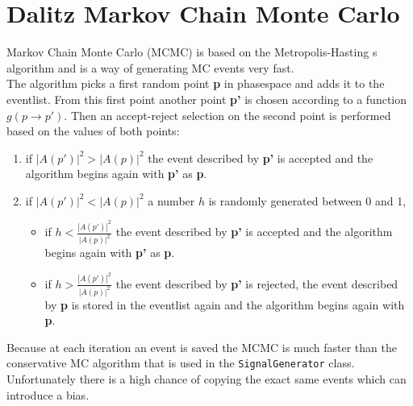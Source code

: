 \section{Dalitz Markov Chain Monte Carlo}
Markov Chain Monte Carlo (MCMC) is based on the Metropolis-Hasting s algorithm and is a way of generating MC events very fast. \\
The algorithm picks a first random point \textbf{p} in phasespace and adds it to the eventlist. From this first point another point \textbf{p'} is chosen according to a function $g(p \rightarrow p')$. Then an accept-reject selection on the second point is performed based on the \PDF values of both points:
\begin{enumerate}
\item if $|A(p')|^2 > |A(p)|^2$ the event described by \textbf{p'} is accepted and the algorithm begins again with \textbf{p'} as \textbf{p}.\\
\item if $|A(p')|^2 < |A(p)|^2$ a number $h$ is randomly generated between 0 and 1,\\
\begin{itemize}
\item if $h < \frac{|A(p')|^2}{|A(p)|^2}$ the event described by \textbf{p'} is accepted and the algorithm begins again with \textbf{p'} as \textbf{p}.\\
\item if $h > \frac{|A(p')|^2}{|A(p)|^2}$ the event described by \textbf{p'} is rejected, the event described by \textbf{p} is stored in the eventlist again and the algorithm begins again with \textbf{p}. \\
\end{itemize}
\end{enumerate}
Because at each iteration an event is saved the MCMC is much faster than the conservative MC algorithm that is used in the \texttt{SignalGenerator} class. Unfortunately there is a high chance of copying the exact same events which can introduce a bias.\\


